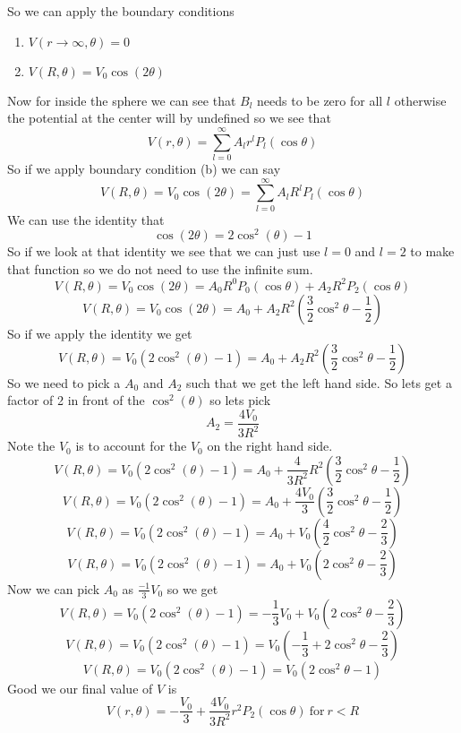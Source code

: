 \documentclass[11pt]{article}
\numberwithin{equation}{section}
\begin{document}
\begin{enumerate}[(i)]
So we can apply the boundary conditions
\begin{enumerate}
\item $V(r\rightarrow\infty, \theta)=0$
\item$V(R,\theta) = V_0\cos(2\theta)$
\end{enumerate}
Now for inside the sphere we can see that $B_l$ needs to be zero for all $l$ otherwise the potential at the center will by undefined so we see that
$$V(r,\theta) = \sum_{l=0}^{\infty}A_lr^lP_l(\cos\theta)$$
So if we apply boundary condition (b) we can say
$$V(R,\theta) =V_0\cos(2\theta) =  \sum_{l=0}^{\infty}A_lR^lP_l(\cos\theta)$$
We can use the identity that $$\cos(2\theta) = 2\cos^2(\theta)-1$$
So if we look at that identity we see that we can just use $l=0$ and $l=2$ to make that function so we do not need to use the infinite sum.
$$V(R,\theta) =V_0\cos(2\theta) =  A_0R^0P_0(\cos\theta)+A_2R^2P_2(\cos\theta)$$
$$V(R,\theta) =V_0\cos(2\theta) =  A_0+A_2R^2\left(\frac{3}{2}\cos^2\theta-\frac{1}{2}\right)$$
So if we apply the identity we get
$$V(R,\theta) =V_0(2\cos^2(\theta)-1)=  A_0+A_2R^2\left(\frac{3}{2}\cos^2\theta-\frac{1}{2}\right)$$
So we need to pick a $A_0$ and $A_2$ such that we get the left hand side. So lets get a factor of 2 in front of the $\cos^2(\theta)$ so lets pick 
$$A_2 = \frac{4V_0}{3R^2}$$
Note the $V_0$ is to account for the $V_0$ on the right hand side.
$$V(R,\theta) =V_0(2\cos^2(\theta)-1)=  A_0+\frac{4}{3R^2}R^2\left(\frac{3}{2}\cos^2\theta-\frac{1}{2}\right)$$
$$V(R,\theta) =V_0(2\cos^2(\theta)-1)=  A_0+\frac{4V_0}{3}\left(\frac{3}{2}\cos^2\theta-\frac{1}{2}\right)$$
$$V(R,\theta) =V_0(2\cos^2(\theta)-1)=  A_0+V_0\left(\frac{4}{2}\cos^2\theta-\frac{2}{3}\right)$$
$$V(R,\theta) =V_0(2\cos^2(\theta)-1)=  A_0+V_0\left(2\cos^2\theta-\frac{2}{3}\right)$$
Now we can pick $A_0$ as $\frac{-1}{3}V_0$ so we get
$$V(R,\theta) =V_0(2\cos^2(\theta)-1)=  -\frac{1}{3}V_0+V_0\left(2\cos^2\theta-\frac{2}{3}\right)$$
$$V(R,\theta) =V_0(2\cos^2(\theta)-1)=  V_0\left(-\frac{1}{3}+2\cos^2\theta-\frac{2}{3}\right)$$
$$V(R,\theta) =V_0(2\cos^2(\theta)-1)=  V_0\left(2\cos^2\theta-1\right)$$
Good we our final value of $V$ is 
$$V(r,\theta) = -\frac{V_0}{3} + \frac{4V_0}{3R^2}r^2P_2(\cos\theta)\ \mbox{for}\ r<R$$



\end{enumerate}
\end{document}

